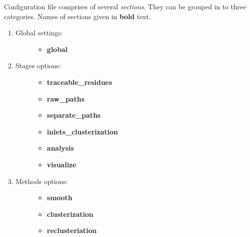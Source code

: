 \documentclass[a4paper,10pt,english]{sphinxmanual}
\begin{document}
Configuration file comprises of several \emph{sections}. They can be grouped in to three categories. Names of sections given in \textbf{bold} text.
\begin{enumerate}
\item {} \begin{description}
\item[{Global settings:}] \leavevmode\begin{itemize}
\item {} 
\textbf{global}

\end{itemize}

\end{description}

\item {} \begin{description}
\item[{Stages options:}] \leavevmode\begin{itemize}
\item {} 
\textbf{traceable\_residues}

\item {} 
\textbf{raw\_paths}

\item {} 
\textbf{separate\_paths}

\item {} 
\textbf{inlets\_clusterization}

\item {} 
\textbf{analysis}

\item {} 
\textbf{visualize}

\end{itemize}

\end{description}

\item {} \begin{description}
\item[{Methods options:}] \leavevmode\begin{itemize}
\item {} 
\textbf{smooth}

\item {} 
\textbf{clusterization}

\item {} 
\textbf{reclusteriation}

\end{itemize}

\end{description}

\end{enumerate}
\end{document}
